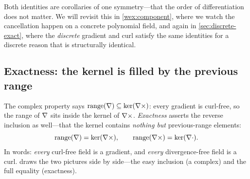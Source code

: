 Both identities are corollaries of one symmetry---that the order of differentiation
does not matter. We will revisit this in \cref{wex:component}, where we watch the
cancellation happen on a concrete polynomial field, and again in
\cref{sec:discrete-exact}, where the \emph{discrete} gradient and curl satisfy the
same identities for a discrete reason that is structurally identical.

\subsection{Exactness: the kernel is filled by the previous range}

The complex property says $\operatorname{range}(\nabla)\subseteq\ker(\nabla\times)$: every
gradient is curl-free, so the range of $\nabla$ sits inside the kernel of $\nabla\times$.
\emph{Exactness} asserts the reverse inclusion as well---that the kernel contains
\emph{nothing but} previous-range elements:
\[
  \operatorname{range}(\nabla) = \ker(\nabla\times), \qquad
  \operatorname{range}(\nabla\times) = \ker(\nabla\cdot).
\]
In words: \emph{every} curl-free field is a gradient, and \emph{every}
divergence-free field is a curl.  draws the two pictures side by
side---the easy inclusion (a complex) and the full equality (exactness).

